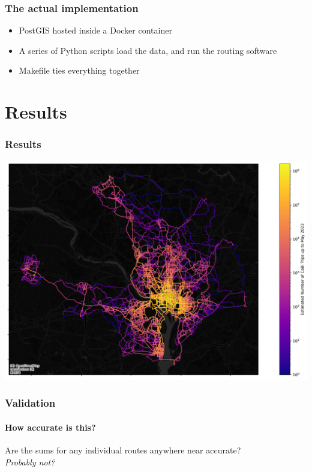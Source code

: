 \documentclass{beamer}
\begin{document}
\begin{frame}
    \frametitle{The actual implementation}

    \begin{itemize}
        \item<1-> PostGIS hosted inside a Docker container 
        \item<2-> A series of Python scripts load the data, and run the routing software
        \item<3-> Makefile ties everything together
    \end{itemize}

\end{frame}
\section{Results}
\begin{frame}
    \frametitle{Results}
    \includegraphics[width=\textwidth]{./network_stats.jpg}
\end{frame}
\begin{frame}
    \frametitle{Validation}
    \framesubtitle{How accurate is this?}

    Are the sums for any individual routes anywhere near accurate? \pause
    \\
    \emph{Probably not?}

\end{frame}
\end{document}

